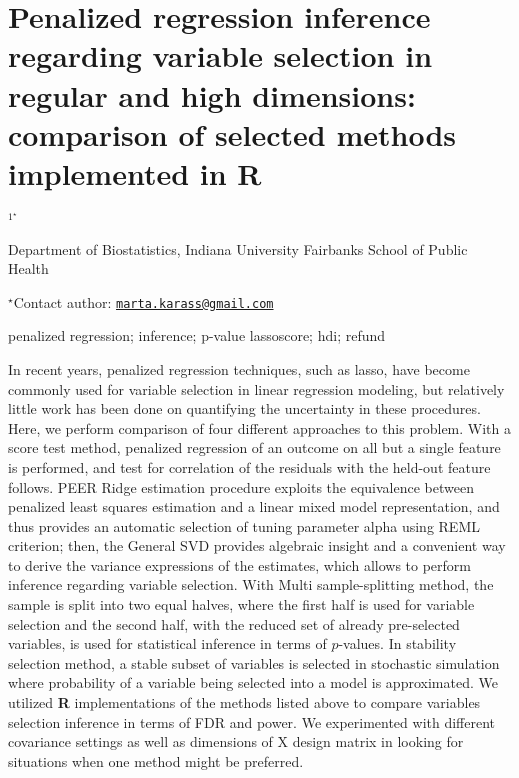 \documentclass[\main/boa.tex]{subfiles}
\begin{document}
\section{Penalized regression inference regarding variable selection in regular
and high dimensions: comparison of selected methods implemented in R}

\begin{center}
  {\bf {}$^{1^\star}$}
\end{center}

\vskip 0.3cm

\begin{affiliations}
\begin{enumerate}
\begin{minipage}{0.915\textwidth}
\centering
\item Department of Biostatistics, Indiana University Fairbanks School of
Public Health \\[-2pt]
\end{minipage}
\end{enumerate}
$^\star$Contact author: \href{mailto:marta.karass@gmail.com}{\nolinkurl{marta.karass@gmail.com}}\\
\end{affiliations}

\vskip 0.5cm

\begin{minipage}{0.915\textwidth}
\keywords penalized regression; inference; p-value
\packages lassoscore; hdi; refund
\end{minipage}

\vskip 0.8cm

In recent years, penalized regression techniques, such as lasso, have
become commonly used for variable selection in linear regression
modeling, but relatively little work has been done on quantifying the
uncertainty in these procedures. Here, we perform comparison of four
different approaches to this problem. With a score test method,
penalized regression of an outcome on all but a single feature is
performed, and test for correlation of the residuals with the held-out
feature follows. PEER Ridge estimation procedure exploits the
equivalence between penalized least squares estimation and a linear
mixed model representation, and thus provides an automatic selection of
tuning parameter alpha using REML criterion; then, the General SVD
provides algebraic insight and a convenient way to derive the variance
expressions of the estimates, which allows to perform inference
regarding variable selection. With Multi sample-splitting method, the
sample is split into two equal halves, where the first half is used for
variable selection and the second half, with the reduced set of already
pre-selected variables, is used for statistical inference in terms of
\(p\)-values. In stability selection method, a stable subset of
variables is selected in stochastic simulation where probability of a
variable being selected into a model is approximated. We utilized
\textbf{R} implementations of the methods listed above to compare
variables selection inference in terms of FDR and power. We experimented
with different covariance settings as well as dimensions of X design
matrix in looking for situations when one method might be preferred.
\end{document}
